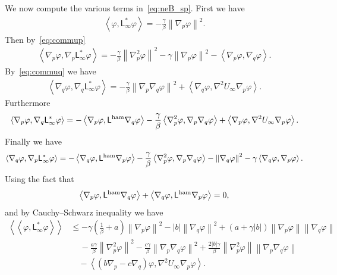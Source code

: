 \documentclass[onefignum,onetabnum]{siamart251216} %
\newcommand{\norm}[1]{\left\lVert#1\right\rVert}
\renewcommand{\leq}{\leqslant}
\newcommand{\adj}{\mathsf{L}_\infty^*}
\newcommand{\Lham}{\mathsf{L}^{\rm{ham}}}
\newcommand{\slangle}[1]{\left\langle #1 \right\rangle}
\newcommand{\dblangle}[1]{\left\langle\!\left\langle #1 \right\rangle\!\right\rangle}
\theoremstyle{plain}
\numberwithin{equation}{section}
\numberwithin{theorem}{section}
\begin{document}
We now compute the various terms in~\eqref{eq:neB_sp}.
First we have
\begin{align}
    \label{eq:gene_fonda}
    \slangle{ \varphi,\adj \varphi} = -\frac{\gamma}{\beta}\norm{\nabla_p\varphi}^2.
\end{align}
Then by~\eqref{eq:commup}
\begin{align}
    \slangle{\nabla_p \varphi,\nabla_p\adj \varphi} = -\frac{\gamma}{\beta}\norm{\nabla_p^2\varphi}^2 -\gamma \norm{\nabla_p \varphi}^2 - \slangle{\nabla_p \varphi,\nabla_q\varphi}.
\end{align}
By~\eqref{eq:commuq} we have
\begin{align}
    \slangle{\nabla_q \varphi,\nabla_q\adj \varphi} = -\frac{\gamma}{\beta}\norm{\nabla_p \nabla_q\varphi}^2 + \slangle{\nabla_q \varphi,\nabla^2 U_\infty \nabla_p \varphi}.
\end{align}
Furthermore
\begin{align}
    \slangle{\nabla_p \varphi,\nabla_q\adj \varphi} = -\slangle{\nabla_p\varphi,\Lham\nabla_q\varphi}-\frac{\gamma}{\beta}\slangle{\nabla_p^2\varphi,\nabla_p\nabla_q\varphi} +\slangle{\nabla_p \varphi,\nabla^2 U_\infty \nabla_p \varphi}.
\end{align}
Finally we have
\begin{align}
    \label{eq:last_part}
    \slangle{\nabla_q \varphi,\nabla_p\adj \varphi} = -\slangle{\nabla_q\varphi,\Lham\nabla_p\varphi}-\frac{\gamma}{\beta}\slangle{\nabla_p^2\varphi,\nabla_p\nabla_q\varphi} - \norm{\nabla_q \varphi}^2 -\gamma \slangle{\nabla_q\varphi,\nabla_p\varphi}.
\end{align}
Using the fact that
\begin{align*}
    \slangle{\nabla_p\varphi,\Lham\nabla_q\varphi} + \slangle{\nabla_q\varphi,\Lham\nabla_p\varphi} = 0,
\end{align*}
and by Cauchy--Schwarz inequality we have
\begin{align*}
    \dblangle{\varphi,\adj\varphi} &\leq -\gamma\!\left(\frac1\beta + a\right)\norm{\nabla_p\varphi}^2 - |b|\norm{\nabla_q\varphi}^2 +(a+\gamma|b|)\norm{\nabla_p\varphi}\norm{\nabla_q\varphi} \\
    &\,\quad-\frac{a\gamma}{\beta}\norm{\nabla_p^2\varphi}^2-\frac{c\gamma}{\beta}\norm{\nabla_p\nabla_q\varphi}^2 +\frac{2|b|\gamma}{\beta}\norm{\nabla_p^2\varphi}\norm{\nabla_p\nabla_q\varphi} \\
    &\quad -\slangle{(b\nabla_p - c\nabla_q)\varphi,\nabla^2U_\infty\nabla_p\varphi}.
\end{align*}
\end{document}
